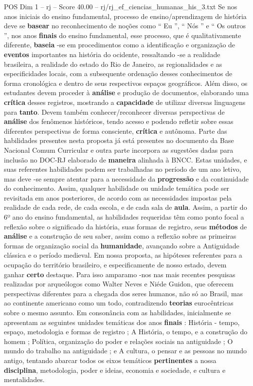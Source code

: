 \begin{textsample}{POS Dim 1 – rj – Score 40.00 – rj/rj\_ef\_ciencias\_humanas\_his\_3.txt}
Se nos anos iniciais do ensino fundamental, processo de ensino/aprendizagem de história deve se \textbf{basear} no reconhecimento de noções como “ Eu ”, “ Nós ” e “ Os outros ”, nos anos \textbf{finais} do ensino fundamental, esse processo, que é qualitativamente diferente, \textbf{baseia} -se em procedimentos como a identificação e organização de \textbf{eventos} importantes na história do ocidente, ressaltando -se a realidade brasileira, a realidade do estado do Rio de Janeiro, as regionalidades e as especificidades locais, com a subsequente ordenação desses conhecimentos de forma cronológica e dentro de seus respectivos espaços geográficos.
Além disso, os estudantes devem proceder à \textbf{análise} e produção de documentos, elaborando uma \textbf{crítica} desses registros, mostrando a \textbf{capacidade} de utilizar diversas linguagens para \textbf{tanto}.
Devem também conhecer/reconhecer diversas perspectivas de \textbf{análise} dos fenômenos históricos, tendo acesso e podendo refletir sobre essas diferentes perspectivas de forma consciente, \textbf{crítica} e autônoma.
Parte das habilidades presentes nesta proposta já está presentes no documento da Base Nacional Comum Curricular e outra parte incorpora as sugestões dadas para inclusão no DOC-RJ elaborado de \textbf{maneira} alinhada à BNCC.
Estas unidades, e suas referentes habilidades podem ser trabalhadas no período de um ano letivo, mas deve -se sempre atentar para a necessidade da \textbf{progressão} e da continuidade do conhecimento.
Assim, qualquer habilidade ou unidade temática pode ser revisitada em anos posteriores, de acordo com as necessidades impostas pela realidade de cada rede, de cada escola, e de cada sala de \textbf{aula}.
Assim, a partir do 6º ano do ensino fundamental, as habilidades requeridas têm como ponto focal a reflexão sobre o significado da história, suas formas de registro, seus \textbf{métodos} de \textbf{análise} e a construção de seu saber, assim como a reflexão sobre as primeiras formas de organização social da \textbf{humanidade}, avançando sobre a Antiguidade clássica e o período medieval.
Em nossa proposta, as hipóteses referentes para a ocupação do território brasileiro, e especificamente de nosso estado, devem ganhar \textbf{certo} destaque.
Para isso amparamo -nos nas mais recentes pesquisas realizadas por arqueólogos como Walter Neves e Niéde Guidon, que oferecem perspectivas diferentes para a chegada dos seres humanos, não só ao Brasil, mas ao continente americano como um todo, contradizendo \textbf{teorias} eurocêntricas sobre o mesmo assunto.
Em consonância com as habilidades, inicialmente se apresentam as seguintes unidades temáticas dos anos \textbf{finais} : História - tempo, espaço, metodologia e formas de registro ; A História, o tempo, e a construção do homem ; Política, organização do poder e relações sociais na antiguidade ; O mundo do trabalho na antiguidade ; e A cultura, o pensar e as pessoas no mundo antigo, tentando abarcar todos os eixos temáticos \textbf{pertinentes} a nossa \textbf{disciplina}, metodologia, poder e ideias, economia e sociedade, e cultura e mentalidades.

\end{textsample}
